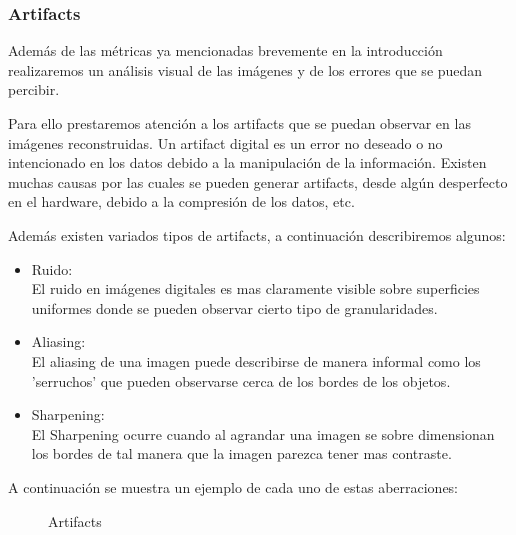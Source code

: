 \subsubsection{Artifacts}

Además de las métricas ya mencionadas brevemente en la introducción realizaremos un análisis visual de las imágenes y de los errores que se puedan percibir.

Para ello prestaremos atención a los artifacts que se puedan observar en las imágenes reconstruidas. Un artifact digital es un error no deseado o no intencionado en los datos debido a la manipulación de la información. Existen muchas causas por las cuales se pueden generar artifacts, desde algún desperfecto en el hardware, debido a la compresión de los datos, etc.

Además existen variados tipos de artifacts, a continuación describiremos algunos:

\begin{itemize}
 \item Ruido:
 \\
 	El ruido en imágenes digitales es mas claramente visible sobre superficies uniformes donde se pueden observar cierto tipo de granularidades.
 \item Aliasing:
 \\
 	El aliasing de una imagen puede describirse de manera informal como los 'serruchos' que pueden observarse cerca de los bordes de los objetos.
 \item Sharpening:
 \\
 El Sharpening ocurre cuando al agrandar una imagen se sobre dimensionan los bordes de tal manera que la imagen parezca tener mas contraste.
\end{itemize}
A continuación se muestra un ejemplo de cada uno de estas aberraciones:
\begin{figure}[H]
\centering
{}
\qquad
{}
\qquad
{}
\caption{Artifacts}
\end{figure}


